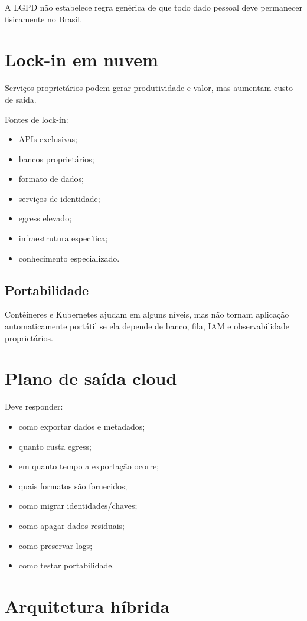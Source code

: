 A LGPD não estabelece regra genérica de que todo dado pessoal deve permanecer fisicamente no Brasil.

\section{Lock-in em nuvem}

Serviços proprietários podem gerar produtividade e valor, mas aumentam custo de saída.

Fontes de lock-in:
\begin{itemize}
\item APIs exclusivas;
\item bancos proprietários;
\item formato de dados;
\item serviços de identidade;
\item egress elevado;
\item infraestrutura específica;
\item conhecimento especializado.
\end{itemize}

\subsection{Portabilidade}

Contêineres e Kubernetes ajudam em alguns níveis, mas não tornam aplicação automaticamente portátil se ela depende de banco, fila, IAM e observabilidade proprietários.

\section{Plano de saída cloud}

Deve responder:
\begin{itemize}
\item como exportar dados e metadados;
\item quanto custa egress;
\item em quanto tempo a exportação ocorre;
\item quais formatos são fornecidos;
\item como migrar identidades/chaves;
\item como apagar dados residuais;
\item como preservar logs;
\item como testar portabilidade.
\end{itemize}

\section{Arquitetura híbrida}

